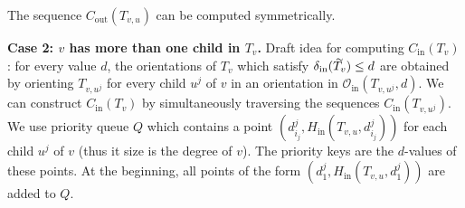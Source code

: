 The sequence $C_\text{out}(T_{v,u})$ can be computed symmetrically.

\textbf{Case 2: $v$ has more than one child in $T_v$.}
Draft idea for computing $C_\text{in}(T_v)$: for every value $d$, the orientations of $T_v$ which satisfy $\delta_\text{in}(\tildeb{T_v}) \leq d$ are obtained by orienting $T_{v,u^j}$ for every child $u^j$ of $v$ in an orientation in $\mathcal{O}_\text{in}(T_{v,u^j}, d)$. We can construct $C_\text{in}(T_v)$ by simultaneously traversing the sequences $C_\text{in}(T_{v,u^j})$. We use priority queue $Q$ which contains a point $(d^j_{i_j}, H_\text{in}(T_{v,u}, d^j_{i_j}))$ for each child $u^j$ of $v$ (thus it size is the degree of $v$). The priority keys are the $d$-values of these points. At the beginning, all points of the form $(d^j_1, H_\text{in}(T_{v,u}, d^j_1))$ are added to $Q$.

